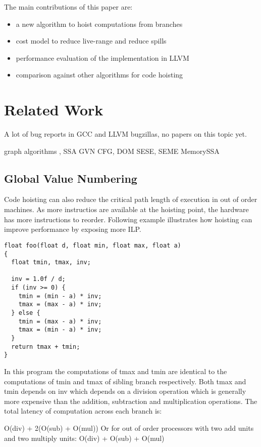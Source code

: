 \documentclass{sig-alternate}
\begin{document}
The main contributions of this paper are:
\begin{itemize}
\item a new algorithm to hoist computations from branches
\item cost model to reduce live-range and reduce spills
\item performance evaluation of the implementation in LLVM
\item comparison against other algorithms for code hoisting
\end{itemize}


\section{Related Work}

A lot of bug reports in GCC and LLVM bugzillas, no papers on this topic yet.


graph algorithms \cite{tarjan},
SSA \cite{cytron}
GVN \cite{rosen1988global,click1995global}
CFG, DOM \cite{dragonbook}
SESE, SEME \cite{sese}
MemorySSA \cite{novillo2007memory}

\subsection{Global Value Numbering}

Code hoisting can also reduce the critical path length of execution in out of
order machines. As more instructios are available at the hoisting point, the
hardware has more instructions to reorder. Following example illustrates how
hoisting can improve performance by exposing more ILP.

\begin{verbatim}
float foo(float d, float min, float max, float a)
{
  float tmin, tmax, inv;

  inv = 1.0f / d;
  if (inv >= 0) {
    tmin = (min - a) * inv;
    tmax = (max - a) * inv;
  } else {
    tmin = (max - a) * inv;
    tmax = (min - a) * inv;
  }
  return tmax + tmin;
}
\end{verbatim}

In this program the computations of tmax and tmin are identical to the
computations of tmin and tmax of sibling branch respectively. Both tmax and tmin
depends on inv which depends on a division operation which is generally more
expensive than the addition, subtraction and multiplication operations. The
total latency of computation across each branch is:

O(div) + 2(O(sub) + O(mul))
Or for out of order processors with two add units and two multiply units:
O(div) + O(sub) + O(mul)
\end{document}
